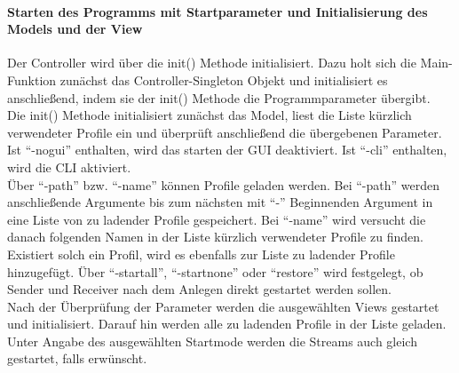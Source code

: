 \paragraph{Starten des Programms mit Startparameter und Initialisierung des Models und der View}
Der Controller wird über die init() Methode initialisiert. Dazu holt sich die Main-Funktion zunächst das Controller-Singleton Objekt und initialisiert es anschließend, indem sie
der init() Methode die Programmparameter übergibt.\\
Die init() Methode initialisiert zunächst das Model, liest die Liste kürzlich verwendeter Profile ein und überprüft anschließend die übergebenen Parameter. Ist "`-nogui"' enthalten, wird das starten der GUI deaktiviert. Ist "`-cli"' enthalten, wird die CLI aktiviert.\\
Über "`-path"' bzw. "`-name"' können Profile geladen werden. Bei "`-path"' werden anschließende Argumente bis zum nächsten mit "`-"' Beginnenden Argument in eine Liste von zu ladender Profile gespeichert. Bei "`-name"' wird versucht die danach folgenden Namen
in der Liste kürzlich verwendeter Profile zu finden. Existiert solch ein Profil, wird es ebenfalls zur Liste zu ladender Profile hinzugefügt. Über "`-startall"', "`-startnone"' oder "`restore"' wird festgelegt, ob Sender und Receiver nach dem Anlegen direkt gestartet werden sollen.\\
Nach der Überprüfung der Parameter werden die ausgewählten Views gestartet und initialisiert. Darauf hin werden alle zu ladenden Profile in der Liste geladen. Unter Angabe des ausgewählten Startmode werden die Streams auch gleich gestartet, falls erwünscht.
